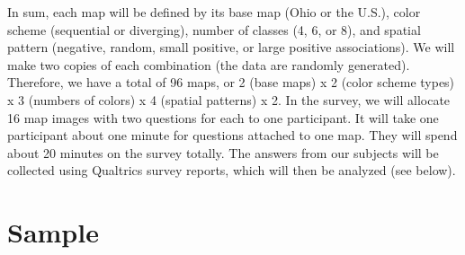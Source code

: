 

In sum, each map will be defined by its base map (Ohio or the U.S.), color scheme (sequential or diverging), number of classes (4, 6, or 8), and spatial pattern (negative, random, small positive, or large positive associations). We will make two copies of each combination (the data are randomly generated). Therefore, we have a total of 96 maps, or 2 (base maps) x 2 (color scheme types) x 3 (numbers of colors) x 4 (spatial patterns) x 2. In the survey, we will allocate 16 map images with two questions for each to one participant. It will take one participant about one minute for questions attached to one map. They will spend about 20 minutes on the survey totally. The answers from our subjects will be collected using Qualtrics survey reports, which will then be analyzed (see below).


\section{Sample}

